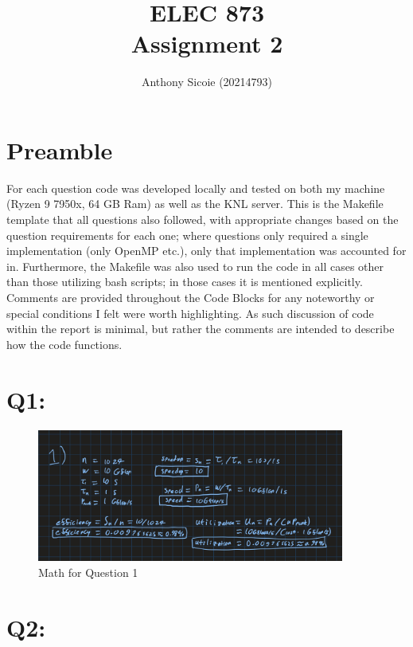 \documentclass[11pt]{article}
\title{%
  ELEC 873 \\
Assignment 2}
\author{Anthony Sicoie (20214793)}
\begin{document}
\maketitle

\section*{Preamble}

For each question code was developed locally and tested on both my machine (Ryzen 9 7950x, 64 GB Ram) as well as the KNL server.
This is the Makefile template that all questions also followed, with appropriate changes based on the question requirements for each one; where questions only required a single implementation (only OpenMP etc.), only that implementation was accounted for in.
Furthermore, the Makefile was also used to run the code in all cases other than those utilizing bash scripts; in those cases it is mentioned explicitly.
Comments are provided throughout the Code Blocks for any noteworthy or special conditions I felt were worth highlighting.
As such discussion of code within the report is minimal, but rather the comments are intended to describe how the code functions.


\section*{Q1:}

\begin{figure}[H]
\centering
    \includegraphics[width=0.9\textwidth]{./images/q1.jpg}
\caption{Math for Question 1}
\label{fig:q1}
\end{figure}

\newpage

\section*{Q2:}
\end{document}
